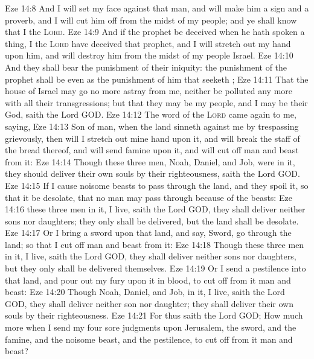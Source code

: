 \vs Eze 14:8 And I will set my face against that man, and will make him a sign and a proverb, and I will cut him off from the midst of my people; and ye shall know that I  the \textsc{Lord}.
\vs Eze 14:9 And if the prophet be deceived when he hath spoken a thing, I the \textsc{Lord} have deceived that prophet, and I will stretch out my hand upon him, and will destroy him from the midst of my people Israel.
\vs Eze 14:10 And they shall bear the punishment of their iniquity: the punishment of the prophet shall be even as the punishment of him that seeketh ;
\vs Eze 14:11 That the house of Israel may go no more astray from me, neither be polluted any more with all their transgressions; but that they may be my people, and I may be their God, saith the Lord GOD.
\vs Eze 14:12 The word of the \textsc{Lord} came again to me, saying,
\vs Eze 14:13 Son of man, when the land sinneth against me by trespassing grievously, then will I stretch out mine hand upon it, and will break the staff of the bread thereof, and will send famine upon it, and will cut off man and beast from it:
\vs Eze 14:14 Though these three men, Noah, Daniel, and Job, were in it, they should deliver  their own souls by their righteousness, saith the Lord GOD.
\vs Eze 14:15 If I cause noisome beasts to pass through the land, and they spoil it, so that it be desolate, that no man may pass through because of the beasts:
\vs Eze 14:16  these three men  in it,  I live, saith the Lord GOD, they shall deliver neither sons nor daughters; they only shall be delivered, but the land shall be desolate.
\vs Eze 14:17 Or  I bring a sword upon that land, and say, Sword, go through the land; so that I cut off man and beast from it:
\vs Eze 14:18 Though these three men  in it,  I live, saith the Lord GOD, they shall deliver neither sons nor daughters, but they only shall be delivered themselves.
\vs Eze 14:19 Or  I send a pestilence into that land, and pour out my fury upon it in blood, to cut off from it man and beast:
\vs Eze 14:20 Though Noah, Daniel, and Job,  in it,  I live, saith the Lord GOD, they shall deliver neither son nor daughter; they shall  deliver their own souls by their righteousness.
\vs Eze 14:21 For thus saith the Lord GOD; How much more when I send my four sore judgments upon Jerusalem, the sword, and the famine, and the noisome beast, and the pestilence, to cut off from it man and beast?
